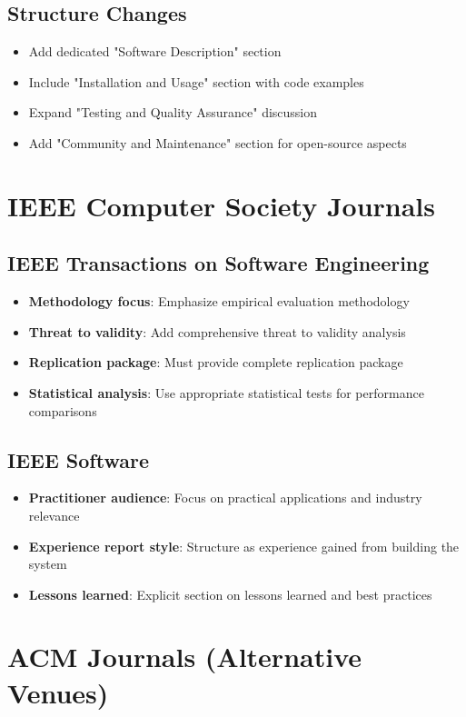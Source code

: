\documentclass{article}
\begin{document}
\subsection{Structure Changes}
\begin{itemize}
\item Add dedicated "Software Description" section
\item Include "Installation and Usage" section with code examples  
\item Expand "Testing and Quality Assurance" discussion
\item Add "Community and Maintenance" section for open-source aspects
\end{itemize}

\section{IEEE Computer Society Journals}

\subsection{IEEE Transactions on Software Engineering}
\begin{itemize}
\item \textbf{Methodology focus}: Emphasize empirical evaluation methodology
\item \textbf{Threat to validity}: Add comprehensive threat to validity analysis
\item \textbf{Replication package}: Must provide complete replication package
\item \textbf{Statistical analysis}: Use appropriate statistical tests for performance comparisons
\end{itemize}

\subsection{IEEE Software}
\begin{itemize}
\item \textbf{Practitioner audience}: Focus on practical applications and industry relevance
\item \textbf{Experience report style}: Structure as experience gained from building the system
\item \textbf{Lessons learned}: Explicit section on lessons learned and best practices
\end{itemize}

\section{ACM Journals (Alternative Venues)}
\end{document}
